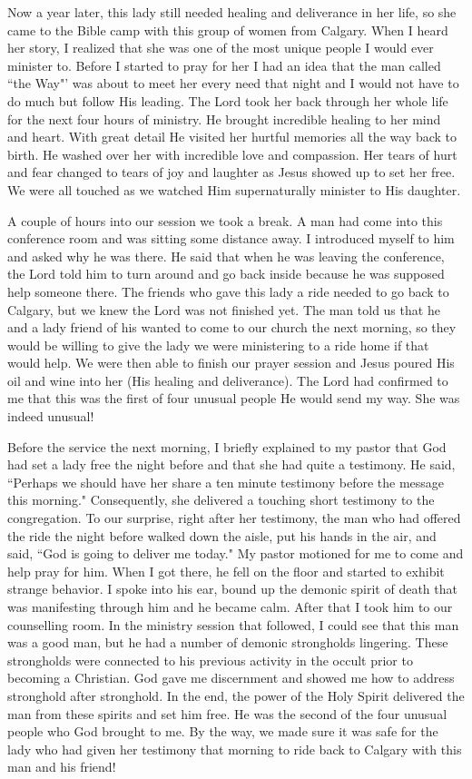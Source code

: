 \documentclass[oneside,12pt]{book}
\begin{document}
Now a year later, this lady still needed healing and deliverance in her life, so she came to the Bible camp with this group of women from Calgary. When I heard her story, I realized that she was one of the most unique people I would ever minister to. Before I started to pray for her I had an idea that the man called ``the Way"' was about to meet her every need that night and I would not have to do much but follow His leading. The Lord took her back through her whole life for the next four hours of ministry. He brought incredible healing to her mind and heart. With great detail He visited her hurtful memories all the way back to birth. He washed over her with incredible love and compassion. Her tears of hurt and fear changed to tears of joy and laughter as Jesus showed up to set her free. We were all touched as we watched Him supernaturally minister to His daughter.


A couple of hours into our session we took a break. A man had come into this conference room and was sitting some distance away. I introduced myself to him and asked why he was there. He said that when he was leaving the conference, the Lord told him to turn around and go back inside because he was supposed help someone there. The friends who gave this lady a ride needed to go back to Calgary, but we knew the Lord was not finished yet. The man told us that he and a lady friend of his wanted to come to our church the next morning, so they would be willing to give the lady we were ministering to a ride home if that would help. We were then able to finish our prayer session and Jesus poured His oil and wine into her (His healing and deliverance). The Lord had confirmed to me that this was the first of four unusual people He would send my way. She was indeed unusual!


Before the service the next morning, I briefly explained to my pastor that God had set a lady free the night before and that she had quite a testimony. He said, ``Perhaps we should have her share a ten minute testimony before the message this morning." Consequently, she delivered a touching short testimony to the congregation. To our surprise, right after her testimony, the man who had offered the ride the night before walked down the aisle, put his hands in the air, and said, ``God is going to deliver me today." My pastor motioned for me to come and help pray for him. When I got there, he fell on the floor and started to exhibit strange behavior. I spoke into his ear, bound up the demonic spirit of death that was manifesting through him and he became calm. After that I took him to our counselling room. In the ministry session that followed, I could see that this man was a good man, but he had a number of demonic strongholds lingering. These strongholds were connected to his previous activity in the occult prior to becoming a Christian. God gave me discernment and showed me how to address stronghold after stronghold. In the end, the power of the Holy Spirit delivered the man from these spirits and set him free. He was the second of the four unusual people who God brought to me. By the way, we made sure it was safe for the lady who had given her testimony that morning to ride back to Calgary with this man and his friend! 
\end{document}
